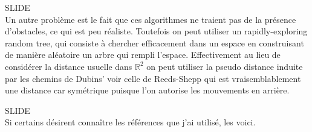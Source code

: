 \documentclass[12pt,a4paper]{article}
\newcommand{\slide}{\vspace{0.6cm}SLIDE\\}
\begin{document}
	\slide
	
	Un autre problème est le fait que ces algorithmes ne traient pas de la présence d'obstacles, ce qui est peu réaliste. Toutefois on peut utiliser un rapidly-exploring random tree, qui consiste à chercher efficacement dans un espace en construisant de manière aléatoire un arbre qui rempli l'espace. Effectivement au lieu de considérer la distance usuelle dans $\mathbb{R}^2$ on peut utiliser la pseudo distance induite par les chemins de Dubins' voir celle de Reeds-Shepp qui est vraisemblablement une distance car symétrique puisque l'on autorise les mouvements en arrière.
	
	
	\slide
	
	Si certains désirent connaître les références que j'ai utilisé, les voici. 
\end{document}
